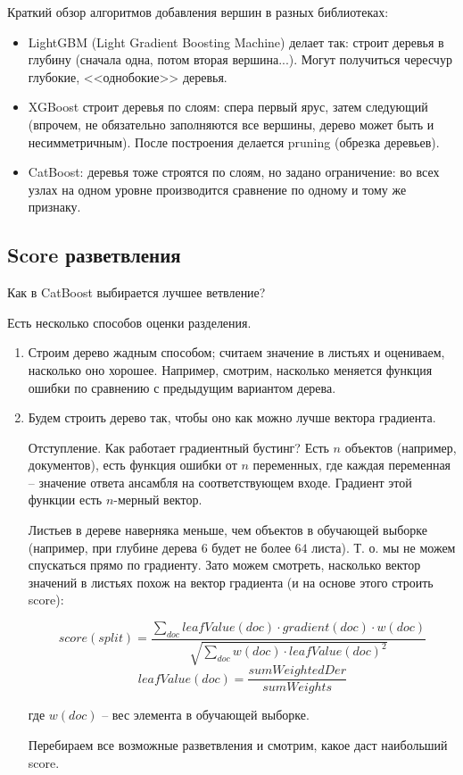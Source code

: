 \documentclass[a4paper,12pt]{article}
\begin{document}
Краткий обзор алгоритмов добавления вершин в разных библиотеках:
\begin{itemize}[noitemsep]
    \item LightGBM (Light Gradient Boosting Machine) делает так: строит деревья в глубину (сначала одна, потом вторая вершина...).
    Могут получиться чересчур глубокие, <<однобокие>> деревья.
    \item XGBoost строит деревья по слоям: спера первый ярус, затем следующий (впрочем, не обязательно заполняются все вершины, дерево может быть и несимметричным).
    После построения делается pruning (обрезка деревьев).
    \item CatBoost: деревья тоже строятся по слоям, но задано ограничение: во всех узлах на одном уровне производится сравнение по одному и тому же признаку.
\end{itemize}

\subsection{Score разветвления}

Как в CatBoost выбирается лучшее ветвление?

Есть несколько способов оценки разделения.

\begin{enumerate}[noitemsep]
    \item Строим дерево жадным способом; считаем значение в листьях и оцениваем, насколько оно хорошее.
    Например, смотрим, насколько меняется функция ошибки по сравнению с предыдущим вариантом дерева.
    \item Будем строить дерево так, чтобы оно как можно лучше вектора градиента.

    Отступление.
    Как работает градиентный бустинг?
    Есть $ n $ объектов (например, документов), есть функция ошибки от $ n $ переменных, где каждая переменная -- значение ответа ансамбля на соответствующем входе.
    Градиент этой функции есть  $ n $-мерный вектор.

    Листьев в дереве наверняка меньше, чем объектов в обучающей выборке (например, при глубине дерева $ 6 $ будет не более $ 64 $ листа).
    Т. о. мы не можем спускаться прямо по градиенту.
    Зато можем смотреть, насколько вектор значений в листьях похож на вектор градиента (и на основе этого строить score):

    $$ score(split) = \frac{\sum_{doc}leafValue(doc) \cdot gradient(doc) \cdot w(doc)}{\sqrt{\sum_{doc} w(doc) \cdot leafValue(doc)^2}} $$
    $$ leafValue(doc) = \frac{sumWeightedDer}{sumWeights} $$

    где $ w(doc) $ -- вес элемента в обучающей выборке.

    Перебираем все возможные разветвления и смотрим, какое даст наибольший score.

\end{enumerate}
\end{document}
